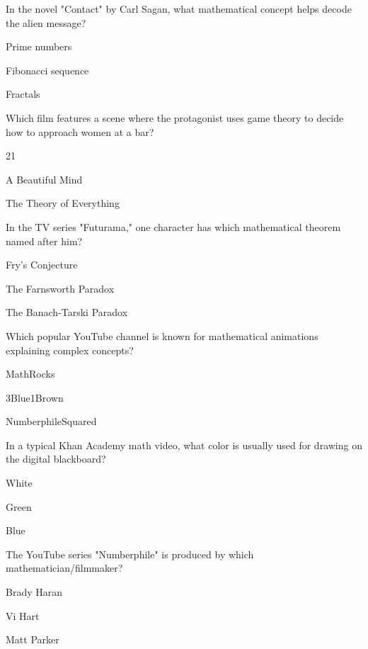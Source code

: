 \begin{enhancedmcq}{In the novel "Contact" by Carl Sagan, what mathematical concept helps decode the alien message?}
\item Prime numbers
\item Fibonacci sequence
\item Fractals

\end{enhancedmcq}
\begin{enhancedmcq}{Which film features a scene where the protagonist uses game theory to decide how to approach women at a bar?}
\item 21
\item A Beautiful Mind
\item The Theory of Everything

\end{enhancedmcq}
\begin{enhancedmcq}{In the TV series "Futurama," one character has which mathematical theorem named after him?}
\item Fry's Conjecture
\item The Farnsworth Paradox
\item The Banach‑Tarski Paradox

\end{enhancedmcq}
\begin{enhancedmcq}{Which popular YouTube channel is known for mathematical animations explaining complex concepts?}
\item MathRocks
\item 3Blue1Brown
\item NumberphileSquared

\end{enhancedmcq}
\begin{enhancedmcq}{In a typical Khan Academy math video, what color is usually used for drawing on the digital blackboard?}
\item White
\item Green
\item Blue

\end{enhancedmcq}
\begin{enhancedmcq}{The YouTube series "Numberphile" is produced by which mathematician/filmmaker?}
\item Brady Haran
\item Vi Hart
\item Matt Parker

\end{enhancedmcq}
